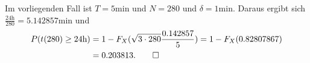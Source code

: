 \begin{loesung}
\begin{teilaufgaben}
Im vorliegenden Fall ist $T=\text{5min}$ und $N=280$ und $\delta=\text{1min}$.
Daraus ergibt sich $\frac{\text{24h}}{280}=5.142857\text{min}$ und
\begin{align*}
P(t(280)\ge \text{24h})
&=
1-F_X(
\sqrt{3\cdot 280}\frac{0.142857}{5}
)
=1-F_X(0.82807867)
\\
&
=0.203813.
\qedhere
\end{align*}
\end{teilaufgaben}
\end{loesung}

